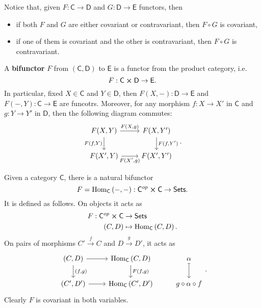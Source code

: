 \begin{rem}
	Notice that, given $F: \mathsf{C} \to \mathsf{D}$ and $G: \mathsf{D} \to \mathsf{E}$ functors, then
	\begin{itemize}
		\item if both $F$ and $G$ are either covariant or contravariant, then $F \circ G$ is covariant,
		\item if one of them is covariant and the other is contravariant, then $F \circ G$ is contravariant.
	\end{itemize}
\end{rem}

\begin{defn}[Bifunctor]
	A \textbf{bifunctor} $F$ from $\left(\mathsf{C}, \mathsf{D}\right)$ to $\mathsf{E}$ is a functor from the product category, i.e.
	\begin{equation}
	F: \mathsf{C}\cross \mathsf{D} \to \mathsf{E} 
	.\end{equation}
	In particular, fixed $X \in \mathsf{C}$ and $Y \in \mathsf{D}$,
	then $F \left(X, - \right): \mathsf{D} \to \mathsf{E}$ and
	$F \left( - , Y \right): \mathsf{C} \to \mathsf{E}$ are funcotrs.
	Moreover, for any morphism $f: X \to X'$ in $\mathsf{C}$ and
	$g: Y \to Y'$ in $\mathsf{D}$, then the following diagram commutes:
	\begin{equation}
	\begin{tikzcd}
		F(X,Y) \arrow[r, "{F(X,g)}", rightarrow]\arrow[d, "{F(f,Y)}"', rightarrow] & F(X,Y')\arrow[d, "{F(f,Y')}", rightarrow] \\
		F(X',Y) \arrow[r, "{F(X',g)}"', rightarrow] & F(X',Y')
	\end{tikzcd}
	.\end{equation} 
\end{defn}

\begin{ex}
	Given a category $\mathsf{C}$, there is a natural bifunctor
	\begin{equation}
	F = \mathrm{Hom}_{\mathsf{C}} \left( -, - \right): \mathsf{C}^{op} \cross \mathsf{C} \to \mathsf{Sets}
	.\end{equation} 
	It is defined as follows.
	On objects it acts as
	\begin{align}
		F: \mathsf{C}^{op} \cross \mathsf{C} &\to \mathsf{Sets} \\
		\left(C, D\right) &\mapsto \mathrm{Hom}_{\mathsf{C}} \left( C, D \right)
	.\end{align} 
	On pairs of morphisms $C' \xrightarrow{f} C$ and $D \xrightarrow{g} D'$, it acts as
	\begin{equation}
	\begin{tikzcd}
		\left(C, D\right) \arrow[r, "", rightarrow] \arrow[d, "{(f,g)}", rightarrow] &
		\mathrm{Hom}_{\mathsf{C}} \left( C, D \right) \arrow[d, "{F(f,g)}", rightarrow] &
		\alpha \arrow[d, "", mapsto]\\
		\left(C', D'\right) \arrow[r, "", rightarrow] &
		\mathrm{Hom}_{\mathsf{C}} \left( C', D' \right) &
		g \circ \alpha \circ f
	\end{tikzcd}
	.\end{equation} 
	Clearly $F$ is covariant in both variables.
\end{ex} 	

